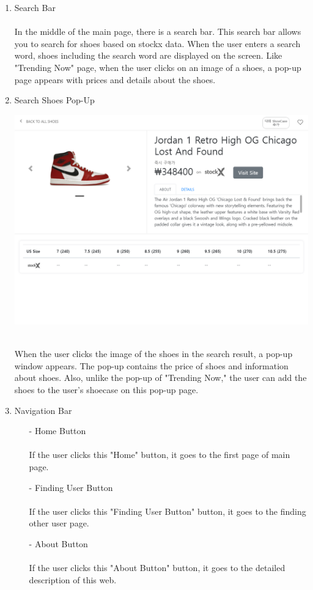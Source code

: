 \documentclass[conference]{IEEEtran}
\begin{document}
\begin{enumerate}
	\item Search Bar \\\\
In the middle of the main page, there is a search bar. This search bar allows you to search for shoes based on stockx data. When the user enters a search word, shoes including the search word are displayed on the screen. Like "Trending Now" page, when the user clicks on an image of a shoes, a pop-up page appears with prices and details about the shoes.\\
	\item Search Shoes Pop-Up\\
\centerline{\includegraphics[scale=0.35]{pics/search_detail.png}}
\\When the user clicks the image of the shoes in the search result, a pop-up window appears. The pop-up contains the price of shoes and information about shoes. Also, unlike the pop-up of "Trending Now," the user can add the shoes to the user's shoecase on this pop-up page. \\
	\item Navigation Bar \\
	\begin{enumerate}
		\item[-]Home Button \\\\
		If the user clicks this "Home" button, it goes to the first page of main page.\\
	\end{enumerate}
	\begin{enumerate}
		\item[-]Finding User Button \\\\
		If the user clicks this "Finding User Button" button, it goes to the finding other user page.\\
	\end{enumerate}
	\begin{enumerate}
		\item[-]About Button \\\\
		If the user clicks this "About Button" button, it goes to the detailed description of this web.\\
	\end{enumerate}


\end{enumerate}
\end{document}
